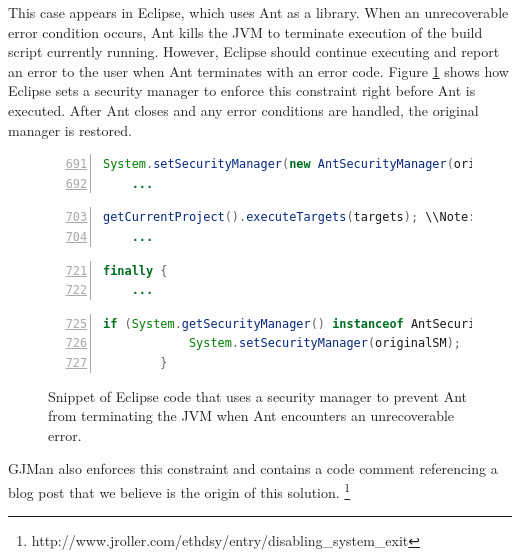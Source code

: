 \documentclass{sig-alternate}
\begin{document}
This case appears in Eclipse, which uses Ant as a library. When an
unrecoverable error condition occurs, Ant kills the JVM to terminate
execution of the build script currently running. However, Eclipse
should continue executing and report an error to the user when Ant
terminates with an error code. Figure \ref{fig:Eclipse-snippet} shows
how Eclipse sets a security manager to enforce this constraint right
before Ant is executed. After Ant closes and any error conditions
are handled, the original manager is restored.

\begin{figure}
\begin{lstlisting}[language=Java,numbers=left,basicstyle={\scriptsize},breaklines=true,firstnumber=691,xrightmargin={0.1cm},numbersep={-10pt}]
    System.setSecurityManager(new AntSecurityManager(originalSM, Thread.currentThread()));
    ...
\end{lstlisting}


\begin{lstlisting}[language=Java,numbers=left,basicstyle={\scriptsize},breaklines=true,firstnumber=703,xrightmargin={0.1cm},numbersep={-10pt}]
    getCurrentProject().executeTargets(targets); \\Note: Ant is executed on this line
    ...
\end{lstlisting}


\begin{lstlisting}[language=Java,numbers=left,basicstyle={\scriptsize},breaklines=true,firstnumber=721,xrightmargin={0.1cm},numbersep={-10pt}]
    finally {
    ...
\end{lstlisting}


\begin{lstlisting}[language=Java,numbers=left,basicstyle={\scriptsize},breaklines=true,firstnumber=725,xrightmargin={0.1cm},numbersep={-10pt}]
        if (System.getSecurityManager() instanceof AntSecurityManager) { 
            System.setSecurityManager(originalSM); 
        }
\end{lstlisting}


\protect\caption{Snippet of Eclipse code that uses a security manager to prevent Ant
from terminating the JVM when Ant encounters an unrecoverable error.}\label{fig:Eclipse-snippet}
\end{figure}

GJMan also enforces this constraint and contains a code comment referencing a
blog post that we believe is the origin of this solution.%
\footnote{http://www.jroller.com/ethdsy/entry/disabling\_system\_exit%
} 
\end{document}
